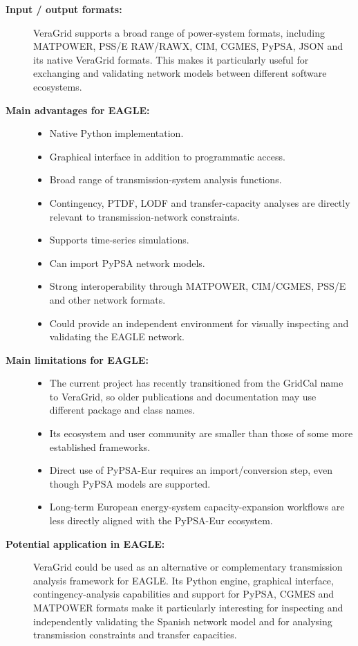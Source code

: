 \begin{description}
    \item[\textbf{Input / output formats:}]
    VeraGrid supports a broad range of power-system formats, including
    MATPOWER, PSS/E RAW/RAWX, CIM, CGMES, PyPSA, JSON and its native
    VeraGrid formats. This makes it particularly useful for exchanging and
    validating network models between different software ecosystems.

    \item[\textbf{Main advantages for EAGLE:}] \hfill
    \begin{itemize}
        \item Native Python implementation.
        \item Graphical interface in addition to programmatic access.
        \item Broad range of transmission-system analysis functions.
        \item Contingency, PTDF, LODF and transfer-capacity analyses are
        directly relevant to transmission-network constraints.
        \item Supports time-series simulations.
        \item Can import PyPSA network models.
        \item Strong interoperability through MATPOWER, CIM/CGMES, PSS/E
        and other network formats.
        \item Could provide an independent environment for visually
        inspecting and validating the EAGLE network.
    \end{itemize}

    \item[\textbf{Main limitations for EAGLE:}] \hfill
    \begin{itemize}
        \item The current project has recently transitioned from the GridCal
        name to VeraGrid, so older publications and documentation may use
        different package and class names.
        \item Its ecosystem and user community are smaller than those of
        some more established frameworks.
        \item Direct use of PyPSA-Eur requires an import/conversion step,
        even though PyPSA models are supported.
        \item Long-term European energy-system capacity-expansion workflows
        are less directly aligned with the PyPSA-Eur ecosystem.
    \end{itemize}

    \item[\textbf{Potential application in EAGLE:}]
    VeraGrid could be used as an alternative or complementary transmission
    analysis framework for EAGLE. Its Python engine, graphical interface,
    contingency-analysis capabilities and support for PyPSA, CGMES and
    MATPOWER formats make it particularly interesting for inspecting and
    independently validating the Spanish network model and for analysing
    transmission constraints and transfer capacities.

\end{description}